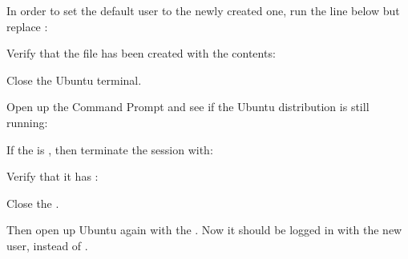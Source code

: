 
In order to set the default user to the newly created one, run the line below but replace :


Verify that the file has been created with the contents:


Close the Ubuntu terminal.

Open up the Command Prompt  and see if the Ubuntu distribution is still running:


If the  is , then terminate the session with:


Verify that it has :


Close the .

Then open up Ubuntu again with the . Now it should be logged in with the new user, instead of .